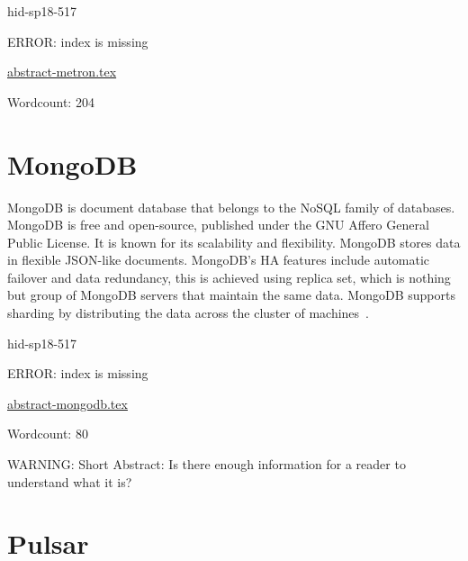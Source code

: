 \begin{IU}

hid-sp18-517

ERROR: index is missing

\href{https://github.com/cloudmesh-community/hid-sp18-517/blob/master//technology/abstract-metron.tex}{abstract-metron.tex}

 

Wordcount: 204

\end{IU}

\section{MongoDB}

MongoDB is document database that belongs to the NoSQL family of 
databases. MongoDB is free and open-source, published under the 
GNU Affero General Public License. It is known for its scalability 
and flexibility. MongoDB stores data in flexible JSON-like 
documents. MongoDB's HA features include automatic failover and 
data redundancy, this is achieved using replica set, which is 
nothing but group of MongoDB servers that maintain the same data. 
MongoDB supports sharding by distributing the data across the 
cluster of machines~\cite{hid-sp18-517-MongoDB-intro}.




\begin{IU}

hid-sp18-517

ERROR: index is missing

\href{https://github.com/cloudmesh-community/hid-sp18-517/blob/master//technology/abstract-mongodb.tex}{abstract-mongodb.tex}

 

Wordcount: 80

WARNING: Short Abstract: Is there enough information for a reader to understand what it is?

\end{IU}

\section{Pulsar}

